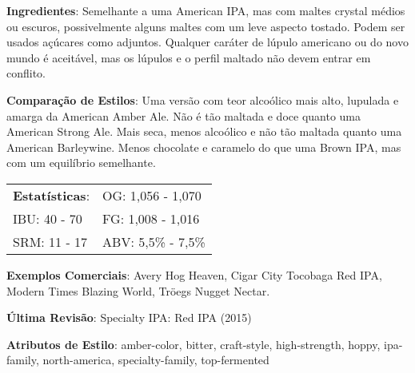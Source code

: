 \textbf{Ingredientes}: Semelhante a uma American IPA, mas com maltes crystal médios ou escuros, possivelmente alguns maltes com um leve aspecto tostado. Podem ser usados açúcares como adjuntos. Qualquer caráter de lúpulo americano ou do novo mundo é aceitável, mas os lúpulos e o perfil maltado não devem entrar em conflito.

\textbf{Comparação de Estilos}: Uma versão com teor alcoólico mais alto, lupulada e amarga da American Amber Ale. Não é tão maltada e doce quanto uma American Strong Ale. Mais seca, menos alcoólico e não tão maltada quanto uma American Barleywine. Menos chocolate e caramelo do que uma Brown IPA, mas com um equilíbrio semelhante.

\begin{tabular}{@{}p{35mm}p{35mm}@{}}
  \textbf{Estatísticas}: & OG: 1,056 - 1,070 \\
  IBU: 40 - 70  & FG: 1,008 - 1,016 \\
  SRM: 11 - 17  & ABV: 5,5\% - 7,5\%
\end{tabular}

\textbf{Exemplos Comerciais}: Avery Hog Heaven, Cigar City Tocobaga Red IPA, Modern Times Blazing World, Tröegs Nugget Nectar.

\textbf{Última Revisão}: Specialty IPA: Red IPA (2015)

\textbf{Atributos de Estilo}: amber-color, bitter, craft-style, high-strength, hoppy, ipa-family, north-america, specialty-family, top-fermented
